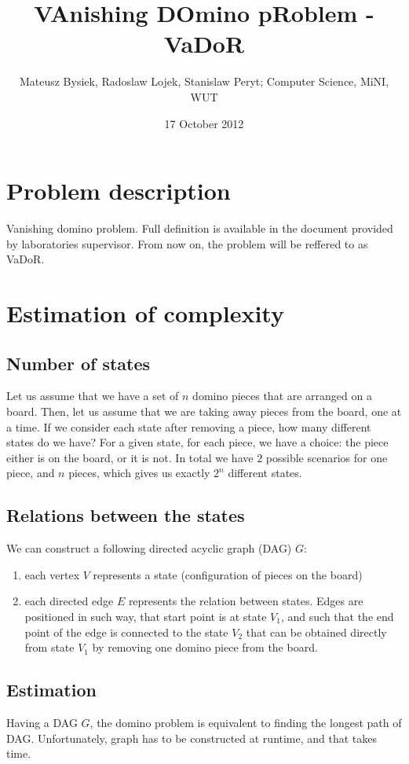 \documentclass{article}
\begin{document}
\title{VAnishing DOmino pRoblem - VaDoR}
\author{Mateusz Bysiek, Radoslaw Lojek, Stanislaw Peryt; Computer Science, MiNI, WUT}
\date{17 October 2012}
\maketitle


\section{Problem description}
Vanishing domino problem. Full definition is available in the document provided by laboratories
supervisor. From now on, the problem will be reffered to as VaDoR.

\section{Estimation of complexity}
\subsection{Number of states}
Let us assume that we have a set of $n$ domino pieces that are arranged on a board. Then, 
let us assume that we are taking away pieces from the board, one at a time. If we consider each 
state after removing a piece, how many different states do we have? For a given state, for each piece, 
we have a choice: the piece either is on the board, or it is not. In total we have $2$ possible scenarios
for one piece, and $n$ pieces, which gives us exactly $2^n$ different states.

\subsection{Relations between the states}
We can construct a following directed acyclic graph (DAG) $G$:
\begin{enumerate}
  \item each vertex $V$ represents a state (configuration of pieces on the board)
  \item each directed edge $E$ represents the relation between states. Edges 
  are positioned in such way, that start point is at state $V_1$, and such that 
  the end point of the edge is connected to the state $V_2$ that can be obtained 
  directly from state $V_1$ by removing one domino piece from the board.
\end{enumerate}

\subsection{Estimation}
Having a DAG $G$, the domino problem is equivalent to finding the longest path of DAG. 
Unfortunately, graph has to be constructed at runtime, and that takes time. 
\end{document}
